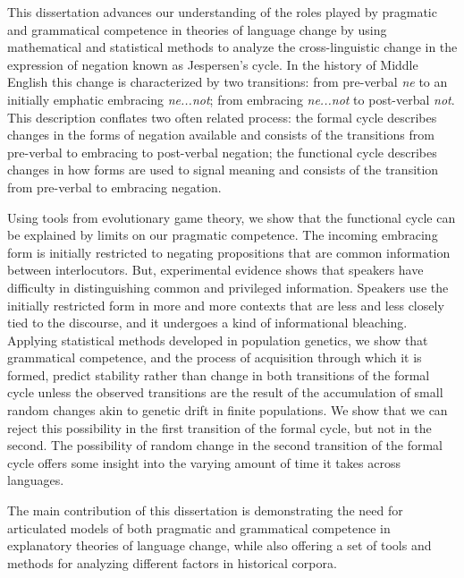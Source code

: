 This dissertation advances our understanding of the roles played by pragmatic and grammatical competence in theories of language change by using mathematical and statistical methods to analyze the cross-linguistic change in the expression of negation known as Jespersen's cycle. In the history of Middle English this change is characterized by two transitions: from pre-verbal \emph{ne} to an initially emphatic embracing \emph{ne...not}; from embracing \emph{ne...not} to post-verbal \emph{not}.  This description conflates two often related process: the formal cycle describes changes in the forms of negation available and consists of the transitions from pre-verbal to embracing to post-verbal negation; the functional cycle describes changes in how forms are used to signal meaning and consists of the transition from pre-verbal to embracing negation.

Using tools from evolutionary game theory, we show that the functional cycle can be explained by limits on our pragmatic competence.  The incoming embracing form is initially restricted to negating propositions that are common information between interlocutors. But, experimental evidence shows that speakers have difficulty in distinguishing common and privileged information. Speakers use the initially restricted form in more and more contexts that are less and less closely tied to the discourse, and it undergoes a kind of informational bleaching. Applying statistical methods developed in population genetics, we show that grammatical competence, and the process of acquisition through which it is formed, predict stability rather than change in both transitions of the formal cycle unless the observed transitions are the result of the accumulation of small random changes akin to genetic drift in finite populations. We show that we can reject this possibility in the first transition of the formal cycle, but not in the second. The possibility of random change in the second transition of the formal cycle offers some insight into the varying amount of time it takes across languages. 

The main contribution of this dissertation is demonstrating the need for articulated models of both pragmatic and grammatical competence in explanatory theories of language change, while also offering a set of tools and methods for analyzing different factors in historical corpora.
